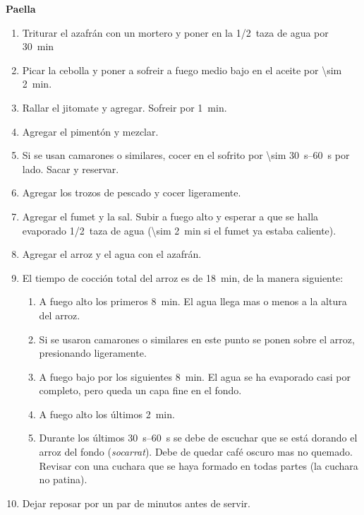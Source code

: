 \textbf{Paella}
\begin{enumerate}
\item Triturar el azafrán con un mortero y poner en la \SI{1/2}{taza} de agua por \SI{30}{min}
\item Picar la cebolla y poner a sofreir a fuego medio bajo en el aceite por \SI{\sim 2}{min}.
\item Rallar el jitomate y agregar. Sofreir por \SI{1}{min}.
\item Agregar el pimentón y mezclar.
\item Si se usan camarones o similares, cocer en el sofrito por \SIrange{\sim 30}{60}{s} por lado. Sacar y reservar.
\item Agregar los trozos de pescado y cocer ligeramente.
\item Agregar el fumet y la sal. Subir a fuego alto y esperar a que se halla evaporado \Sim\SI{1/2}{taza} de agua (\SI{\sim 2}{min} si el fumet ya estaba caliente).
\item Agregar el arroz y el agua con el azafrán.
\item El tiempo de cocción total del arroz es de \SI{18}{min}, de la manera siguiente:
\begin{enumerate}
\item A fuego alto los primeros \SI{8}{min}. El agua llega mas o menos a la altura del arroz. 
\item Si se usaron camarones o similares en este punto se ponen sobre el arroz, presionando ligeramente.
\item A fuego bajo por los siguientes \SI{8}{min}. El agua se ha evaporado casi por completo, pero queda un capa fine en el fondo.
\item A fuego alto los últimos \SI{2}{min}.
\item Durante los últimos \SIrange{30}{60}{s} se debe de escuchar que se está dorando el arroz del fondo (\textit{socarrat}). Debe de quedar café oscuro mas no quemado. Revisar con una cuchara que se haya formado en todas partes (la cuchara no patina).
\end{enumerate}
\item Dejar reposar por un par de minutos antes de servir.
\end{enumerate}